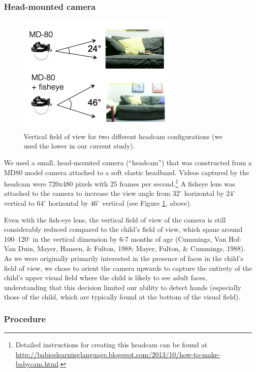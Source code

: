 \documentclass[english,man]{apa6}
\begin{document}
\subsubsection{Head-mounted camera}\label{head-mounted-camera}

\begin{figure}[H]
\includegraphics[width=0.4\linewidth]{images/view_angle_redone} \caption{Vertical field of view for two different headcam configurations (we used the lower in our current study).}\label{fig:headcam}
\end{figure}

We used a small, head-mounted camera (\enquote{headcam}) that was
constructed from a MD80 model camera attached to a soft elastic
headband. Videos captured by the headcam were 720x480 pixels with 25
frames per second.\footnote{Detailed instructions for creating this
  headcam can be found at
  \url{http://babieslearninglanguage.blogspot.com/2013/10/how-to-make-babycam.html}.}
A fisheye lens was attached to the camera to increase the view angle
from \(32^{\circ}\) horizontal by \(24^{\circ}\) vertical to
\(64^{\circ}\) horizontal by \(46^{\circ}\) vertical (see Figure
\ref{fig:headcam}, above).

Even with the fish-eye lens, the vertical field of view of the camera is
still considerably reduced compared to the child's field of view, which
spans around 100--120\(^{\circ}\) in the vertical dimension by 6-7
months of age (Cummings, Van Hof-Van Duin, Mayer, Hansen, \& Fulton,
1988; Mayer, Fulton, \& Cummings, 1988). As we were originally primarily
interested in the presence of faces in the child's field of view, we
chose to orient the camera upwards to capture the entirety of the
child's upper visual field where the child is likely to see adult faces,
understanding that this decision limited our ability to detect hands
(especially those of the child, which are typically found at the bottom
of the visual field).

\subsubsection{Procedure}\label{procedure}
\end{document}
